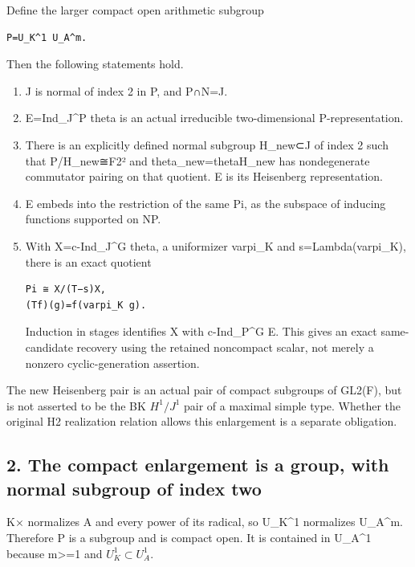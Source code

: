 Define the larger compact open arithmetic subgroup

\begin{Verbatim}[fontsize=\small,breaklines=true,breakanywhere=true]
P=U_K^1 U_A^m.
\end{Verbatim}

Then the following statements hold.

\begin{enumerate}
\def\labelenumi{\arabic{enumi}.}
\item
  J is normal of index 2 in P, and P∩N=J.
\item
  E=Ind\_J\^{}P theta is an actual irreducible two-dimensional
  P-representation.
\item
  There is an explicitly defined normal subgroup H\_new⊂J of index 2 such
  that P/H\_new≅F2² and theta\_new=theta\textbar H\_new has
  nondegenerate commutator pairing on that quotient. E is its Heisenberg
  representation.
\item
  E embeds into the restriction of the same Pi, as the subspace of
  inducing functions supported on NP.
\item
  With X=c-Ind\_J\^{}G theta, a uniformizer varpi\_K and
  s=Lambda(varpi\_K), there is an exact quotient

\begin{Verbatim}[fontsize=\small,breaklines=true,breakanywhere=true]
Pi ≅ X/(T−s)X,
(Tf)(g)=f(varpi_K g).
\end{Verbatim}

  Induction in stages identifies X with c-Ind\_P\^{}G E. This gives an
  exact same-candidate recovery using the retained noncompact scalar,
  not merely a nonzero cyclic-generation assertion.
\end{enumerate}

The new Heisenberg pair is an actual pair of compact subgroups of
GL2(F), but is not asserted to be the BK \(H^1/J^1\) pair of
a maximal simple type. Whether the original H2 realization relation
allows this enlargement is a separate obligation.

\hypertarget{rank2-the-compact-enlargement-is-a-group-with-normal-subgroup-of-index-two}{%
\subsection{2. The compact enlargement is a group, with normal subgroup
of index
two}\label{rank2-the-compact-enlargement-is-a-group-with-normal-subgroup-of-index-two}}

K× normalizes A and every power of its radical, so U\_K\^{}1 normalizes
U\_A\^{}m. Therefore P is a subgroup and is compact open. It is
contained in U\_A\^{}1 because m\textgreater=1 and
\(U_K^1\subset U_A^1\).

